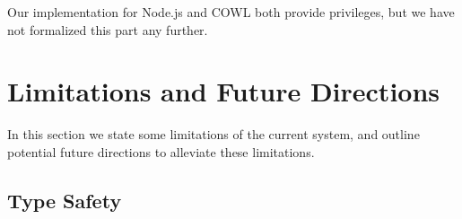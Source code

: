 Our implementation for Node.js and COWL both provide privileges, but
we have not formalized this part any further.

%
%
%
%      




\section{Limitations and Future Directions}

In this section we state some limitations of the current system, and
outline potential future directions to alleviate these limitations.

\subsection{Type Safety}
\label{sec:extensions:types}

